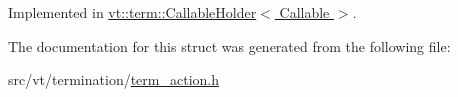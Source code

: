 Implemented in \hyperlink{structvt_1_1term_1_1_callable_holder_a33bc8b5d543eb4338c257522cc0084f1}{vt\+::term\+::\+Callable\+Holder$<$ Callable $>$}.



The documentation for this struct was generated from the following file\+:\begin{DoxyCompactItemize}
\item 
src/vt/termination/\hyperlink{term__action_8h}{term\+\_\+action.\+h}\end{DoxyCompactItemize}
